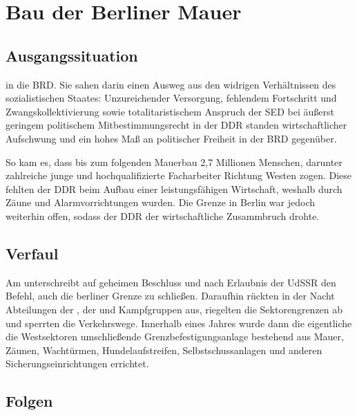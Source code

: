 \section[Bau der Berliner Mauer]{Bau der Berliner
Mauer}
\label{sec:mauerbau}

\subsection*{Ausgangssituation}

 in die BRD. Sie sahen darin einen
Ausweg aus den widrigen Verhältnissen des sozialistischen Staates:
Unzureichender Versorgung, fehlendem Fortschritt und
Zwangskollektivierung sowie totalitaristischem Anspruch der SED bei
äußerst geringem politischem Mitbestimmungsrecht in der DDR standen
wirtschaftlicher Aufschwung und ein hohes Maß an politischer Freiheit
in der BRD gegenüber.

So kam es, dass bis zum folgenden Mauerbau 2,7 Millionen Menschen,
darunter zahlreiche junge und hochqualifizierte Facharbeiter Richtung
Westen zogen. Diese fehlten der DDR beim Aufbau einer leistungsfähigen
Wirtschaft, weshalb  durch Zäune und
Alarmvorrichtungen  wurden. Die Grenze in Berlin war
jedoch weiterhin offen, sodass  der DDR der
wirtschaftliche Zusammbruch drohte.

\subsection*{Verfaul}

Am  unterschreibt  auf geheimen Beschluss und nach Erlaubnis der UdSSR den
Befehl, auch die berliner Grenze zu schließen. Daraufhin rückten in
der Nacht Abteilungen der , der
 und Kampfgruppen aus, riegelten die Sektorengrenzen
ab und sperrten die Verkehrswege. Innerhalb eines Jahres wurde dann
die eigentliche die Westsektoren umschließende Grenzbefestigungsanlage
bestehend aus Mauer, Zäunen, Wachtürmen, Hundelaufstreifen,
Selbstschussanlagen und anderen Sicherungseinrichtungen errichtet.

\subsection*{Folgen}


